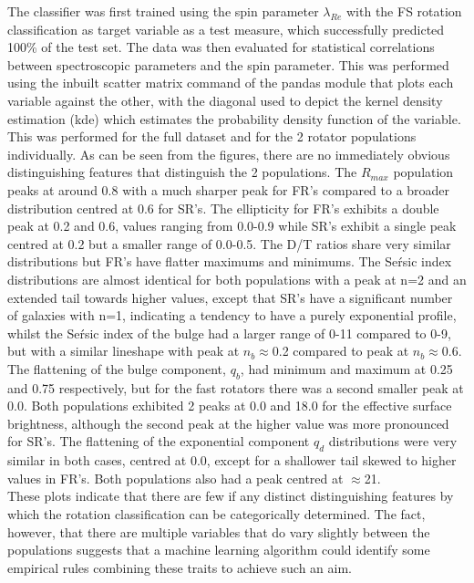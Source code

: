 The classifier was first trained using the spin parameter $\lambda_{Re}$ with the FS rotation classification as target variable as a test measure, which successfully predicted 100\% of the test set. The data was then evaluated for statistical correlations between spectroscopic parameters and the spin parameter. This was performed using the inbuilt scatter matrix command of the pandas module that plots each variable against the other, with the diagonal used to depict the kernel density estimation (kde) which estimates the probability density function of the variable. This was performed for the full dataset and for the 2 rotator populations individually. As can be seen from the figures, there are no immediately obvious distinguishing features that distinguish the 2 populations. The $R_{max}$ population peaks at around 0.8 with a much sharper peak for FR's compared to a broader distribution centred at 0.6 for SR's. The ellipticity for FR's exhibits a double peak at 0.2 and 0.6, values ranging from 0.0-0.9 while SR's exhibit a single peak centred at 0.2 but a smaller range of 0.0-0.5. The D/T ratios share very similar distributions but FR's have flatter maximums and minimums. The Se\'rsic index distributions are almost identical for both populations with a peak at n=2 and an extended tail towards higher values, except that SR's have a significant number of galaxies with n=1, indicating a tendency to have a purely exponential profile, whilst the Se\'rsic index of the bulge had a larger range of 0-11 compared to 0-9, but with a similar lineshape with peak at $n_{b}\approx$0.2 compared to peak at $n_{b}\approx$0.6. The flattening of the bulge component, $q_{b}$, had minimum and maximum at 0.25 and 0.75 respectively, but for the fast rotators there was a second smaller peak at 0.0. Both populations exhibited 2 peaks at 0.0 and 18.0 for the effective surface brightness, although the second peak at the higher value was more pronounced for SR's. The flattening of the exponential component $q_{d}$ distributions were very similar in both cases, centred at 0.0, except for a shallower tail skewed to higher values in FR's. Both populations also had a peak centred at $\approx$21. \\

These plots indicate that there are few if any distinct distinguishing features by which the rotation classification can be categorically determined. The fact, however, that there are multiple variables that do vary slightly between the populations suggests that a machine learning algorithm could identify some empirical rules combining these traits to achieve such an aim.


